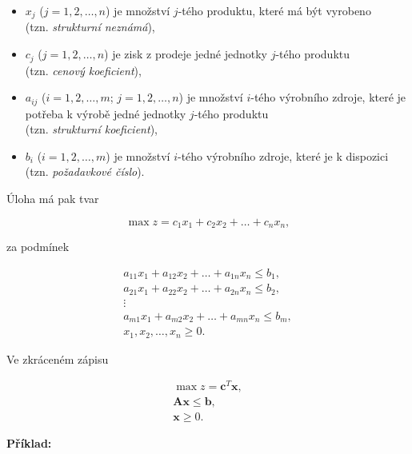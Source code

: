 \begin{itemize}[label={}]
    \item $x_j$ ($j = 1, 2, \ldots, n$) je množství $j$-tého produktu, které má být vyrobeno \\(tzn. \textit{strukturní neznámá}),
    \item $c_j$ ($j = 1, 2, \ldots, n$) je zisk z prodeje jedné jednotky $j$-tého produktu \\(tzn. \textit{cenový koeficient}),
    \item $a_{ij}$ ($i = 1, 2, \ldots, m$; $j = 1, 2, \ldots, n$) je množství $i$-tého výrobního zdroje, které je potřeba k výrobě jedné jednotky $j$-tého produktu \\(tzn. \textit{strukturní koeficient}),
    \item $b_i$ ($i = 1, 2, \ldots, m$) je množství $i$-tého výrobního zdroje, které je k dispozici \\(tzn. \textit{požadavkové číslo}).
\end{itemize}

Úloha má pak tvar

\begin{equation}
        \max z = c_1x_1 + c_2x_2 + \ldots + c_nx_n,
\end{equation}

za podmínek

\begin{equation}
    \begin{gathered}
        a_{11}x_1 + a_{12}x_2 + \ldots + a_{1n}x_n \leq b_1, \\
        a_{21}x_1 + a_{22}x_2 + \ldots + a_{2n}x_n \leq b_2, \\
        \vdots \\
        a_{m1}x_1 + a_{m2}x_2 + \ldots + a_{mn}x_n \leq b_m, \\
        x_1, x_2, \ldots, x_n \geq 0.
    \end{gathered}
\end{equation}

Ve zkráceném zápisu

\begin{equation}
    \begin{gathered}
        \max z = \bm{c}^T\bm{x}, \\
        \bm{A}\bm{x} \leq \bm{b}, \\
        \bm{x} \geq 0.
    \end{gathered}
\end{equation}

\textbf{Příklad:}

